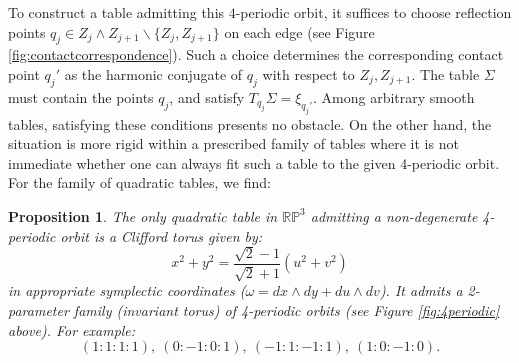 \documentclass{article}
\newtheorem{prop}{Proposition}[section]
\begin{document}
To construct a table admitting this $4$-periodic orbit, it suffices to choose reflection 
points $q_j\in Z_j\wedge Z_{j+1}\backslash \{ Z_j, Z_{j+1}\}$ on each edge (see Figure 
\ref{fig:contactcorrespondence}). Such a choice determines the corresponding contact point 
$q_j'$ as the harmonic conjugate of $q_j$ with respect to $Z_j, Z_{j+1}$. The table 
$\Sigma$ must contain the points $q_j$, and satisfy $T_{q_j}\Sigma = \xi_{q_j'}$. Among 
arbitrary smooth tables, satisfying these conditions presents no obstacle. On the other 
hand, the situation is more rigid within a prescribed family of tables where it is not 
immediate whether one can always fit such a table to the given 4-periodic orbit. For the 
family of quadratic tables, we find:%


\begin{prop}\label{prop:4PerQuad}
    The {\em only} quadratic table in $\mathbb{RP}^3$ admitting a non-degenerate 4-periodic 
    orbit is a Clifford torus given by:
    \[   x^2 + y^2 = \frac{\sqrt{2}-1}{\sqrt{2} + 1}(u^2 + v^2) \]
    in appropriate symplectic coordinates ($\omega = dx\wedge dy + du\wedge dv$). It admits 
    a 2-parameter family (invariant torus) of 4-periodic orbits (see Figure 
    \ref{fig:4periodic} above). For example:%
\[ (1:1:1:1), ~ (0:-1:0:1), ~(-1:1:-1:1), ~ (1:0:-1:0).  \]
\end{prop}
\end{document}
